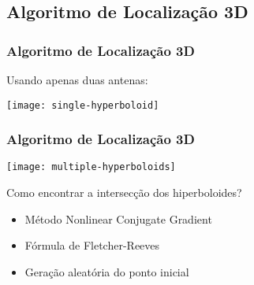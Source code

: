 \subsection{Algoritmo de Localização 3D}
\begin{frame}
    \frametitle{Algoritmo de Localização 3D}
    Usando apenas \alert{duas antenas}:

    \begin{center}
        \texttt{[image: single-hyperboloid]}
    \end{center}
\end{frame}

\begin{frame}
    \frametitle{Algoritmo de Localização 3D}
    \begin{center}
        \texttt{[image: multiple-hyperboloids]}
    \end{center}

    Como encontrar a \alert{intersecção dos hiperboloides}?
    \begin{itemize}
        \item Método \alert{Nonlinear Conjugate Gradient}
        \item Fórmula de \alert{Fletcher-Reeves}
        \item \alert{Geração aleatória do ponto inicial}
    \end{itemize}
\end{frame}
